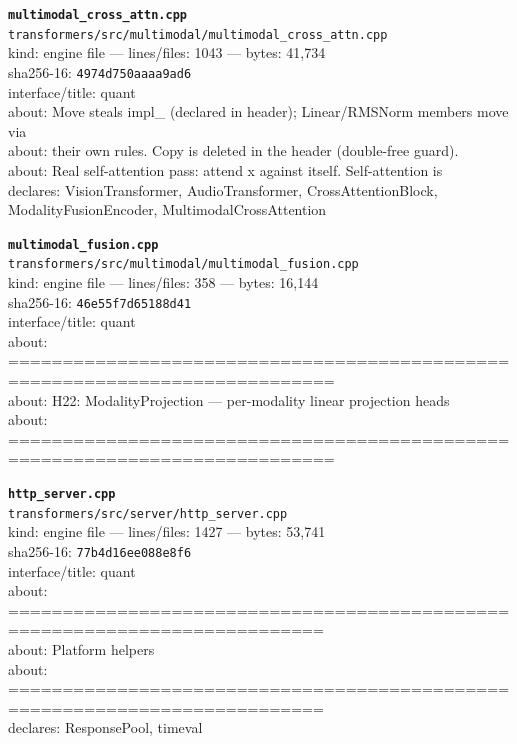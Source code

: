 \noindent\textbf{\texttt{multimodal\_cross\_attn.cpp}}\\
\texttt{transformers/src/multimodal/multimodal\_cross\_attn.cpp}\\
kind: engine file --- lines/files: 1043 --- bytes: 41,734\\
sha256-16: \texttt{4974d750aaaa9ad6}\\
interface/title: quant\\
about: Move steals impl\_ (declared in header); Linear/RMSNorm members move via\\
about: their own rules. Copy is deleted in the header (double-free guard).\\
about: Real self-attention pass: attend x against itself. Self-attention is\\
declares: VisionTransformer, AudioTransformer, CrossAttentionBlock, ModalityFusionEncoder, MultimodalCrossAttention\\
\vspace*{6.0pt}
\newpage

\noindent\textbf{\texttt{multimodal\_fusion.cpp}}\\
\texttt{transformers/src/multimodal/multimodal\_fusion.cpp}\\
kind: engine file --- lines/files: 358 --- bytes: 16,144\\
sha256-16: \texttt{46e55f7d65188d41}\\
interface/title: quant\\
about: ============================================================================\\
about: H22: ModalityProjection — per-modality linear projection heads\\
about: ============================================================================\\
\vspace*{6.0pt}

\noindent\textbf{\texttt{http\_server.cpp}}\\
\texttt{transformers/src/server/http\_server.cpp}\\
kind: engine file --- lines/files: 1427 --- bytes: 53,741\\
sha256-16: \texttt{77b4d16ee088e8f6}\\
interface/title: quant\\
about: ===========================================================================\\
about: Platform helpers\\
about: ===========================================================================\\
declares: ResponsePool, timeval\\
\vspace*{6.0pt}

